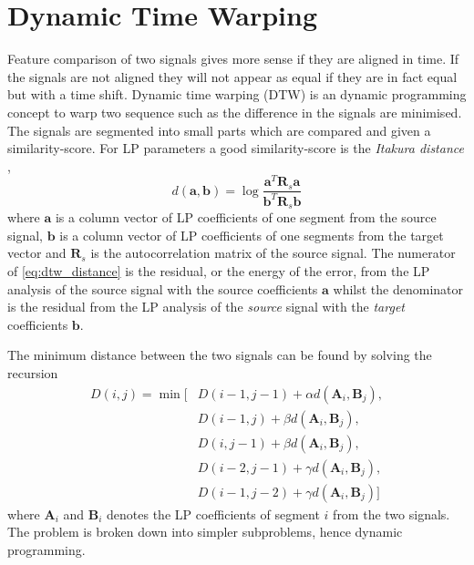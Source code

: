 \section{Dynamic Time Warping} %
\label{sec:dynamic_time_warping}
Feature comparison of two signals gives more sense if they are aligned in time. If the signals are not aligned they will not appear as equal if they are in fact equal but with a time shift. Dynamic time warping (DTW) is an dynamic programming concept to warp two sequence such as the difference in the signals are minimised. The signals are segmented into small parts which are compared and given a similarity-score. For LP parameters a good similarity-score is the \emph{Itakura distance} \cite{itakura90},
\begin{equation}
	\label{eq:dtw_distance}
		d(\mathbf{a},\mathbf{b}) = \log\frac{\mathbf{a}^T \mathbf{R}_s \mathbf{a}}{\mathbf{b}^T \mathbf{R}_s \mathbf{b}}
\end{equation}
where $\mathbf{a}$ is a column vector of LP coefficients of one segment from the source signal, $\mathbf{b}$ is a column vector of LP coefficients of one segments from the target vector and $\mathbf{R}_s$ is the autocorrelation matrix of the source signal. The numerator of \eqref{eq:dtw_distance} is the residual, or the energy of the error, from the LP analysis of the source signal with the source coefficients $\mathbf{a}$ whilst the denominator is the residual from the LP analysis of the \emph{source} signal with the \emph{target} coefficients $\mathbf{b}$. 

The minimum distance between the two signals can be found by solving the recursion \cite{taletek}
\begin{equation}
	\label{eq:dtw_recursion}
	\begin{split}
		D(i,j) = \min \bigl[&D(i-1,j-1)+\alpha d(\mathbf{A}_i,\mathbf{B}_j),\\
		& D(i-1,j)+\beta d(\mathbf{A}_i,\mathbf{B}_j),\\
		& D(i,j-1)+\beta d(\mathbf{A}_i,\mathbf{B}_j),\\
		& D(i-2,j-1)+\gamma d(\mathbf{A}_i,\mathbf{B}_j),\\
		& D(i-1,j-2)+\gamma d(\mathbf{A}_i,\mathbf{B}_j)\bigr]		
	\end{split}
\end{equation}
where $\mathbf{A}_i$ and $\mathbf{B}_i$ denotes the LP coefficients of segment $i$ from the two signals. 
The problem is broken down into simpler subproblems, hence dynamic programming. 


